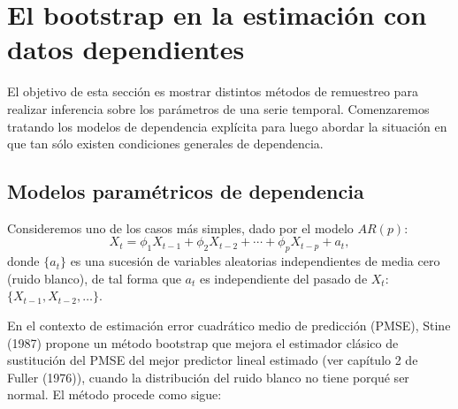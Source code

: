\documentclass[]{book}
\theoremstyle{definition}
\theoremstyle{definition}
\theoremstyle{definition}
\theoremstyle{remark}
\begin{document}
\section{El bootstrap en la estimación con datos
dependientes}\label{el-bootstrap-en-la-estimacion-con-datos-dependientes}

El objetivo de esta sección es mostrar distintos métodos de remuestreo
para realizar inferencia sobre los parámetros de una serie temporal.
Comenzaremos tratando los modelos de dependencia explícita para luego
abordar la situación en que tan sólo existen condiciones generales de
dependencia.

\subsection{Modelos paramétricos de
dependencia}\label{modelos-parametricos-de-dependencia-1}

Consideremos uno de los casos más simples, dado por el modelo \(AR(p)\):
\[X_{t}=\phi _1X_{t-1}+\phi _2X_{t-2}+\cdots +\phi _{p}X_{t-p}+a_{t},\]donde
\(\{a_{t}\}\) es una sucesión de variables aleatorias independientes de
media cero (ruido blanco), de tal forma que \(a_{t}\) es independiente
del pasado de \(X_{t}\): \(\{X_{t-1},X_{t-2},\ldots \}\).

En el contexto de estimación error cuadrático medio de predicción
(PMSE), Stine (1987) propone un método bootstrap que mejora el estimador
clásico de sustitución del PMSE del mejor predictor lineal estimado (ver
capítulo 2 de Fuller (1976)), cuando la distribución del ruido blanco no
tiene porqué ser normal. El método procede como sigue:
\end{document}
